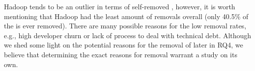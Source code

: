 Hadoop tends to be an outlier in terms of self-removed \SATD, however, it is worth mentioning that Hadoop had the least amount of removals overall (only 40.5\% of the \SATD is ever removed). There are many possible reasons for the low removal rates, e.g., high developer churn or lack of process to deal with technical debt. Although we shed some light on the potential reasons for the removal of \SATD later in RQ4, we believe that determining the exact reasons for \SATD removal warrant a study on its own.






